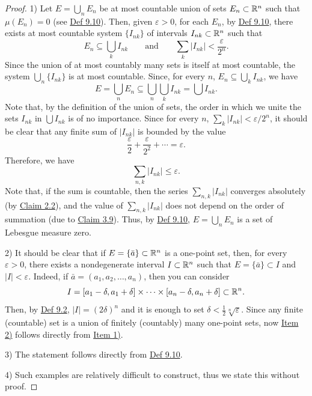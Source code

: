 \begin{proof}
1) Let $E=\bigcup_n E_n$ be at most countable union of sets $E_n\subset\mathbb{R}^n$ such that $\mu(E_n)=0$ (see \hyperref[def:9.10]{Def 9.10}).
Then, given $\varepsilon>0$, for each $E_n$, by \hyperref[def:9.10]{Def 9.10}, there exists at most countable system $\{I_{nk}\}$ of intervals $I_{nk}\subset\mathbb{R}^n$ such that
\[
E_n\subseteq\bigcup_k I_{nk}
\qquad\text{and}\qquad
\sum_k |I_{nk}|<\frac{\varepsilon}{2^n}.
\]
Since the union of at most countably many sets is itself at most countable, the system $\bigcup_n\{I_{nk}\}$ is at most countable. Since, for every $n$, $E_n\subseteq\bigcup_k I_{nk}$, we have
\[
E=\bigcup_n E_n\subseteq\bigcup_n\bigcup_k I_{nk}=\bigcup I_{nk}.
\]
Note that, by the definition of the union of sets, the order in which we unite the sets $I_{nk}$ in $\bigcup I_{nk}$ is of no importance.
Since for every $n$, $\sum_k |I_{nk}|<\varepsilon/2^n$, it should be clear that any finite sum of $|I_{nk}|$ is bounded by the value
\[
\frac{\varepsilon}{2}+\frac{\varepsilon}{2^2}+\cdots=\varepsilon.
\]
Therefore, we have
\[
\sum_{n,k}|I_{nk}|\leq\varepsilon.
\]
Note that, if the sum is countable, then the series $\sum_{n,k}|I_{nk}|$ converges absolutely (by \hyperref[claim:2.2]{Claim 2.2}), and the value of $\sum_{n,k}|I_{nk}|$ does not depend on the order of summation (due to \hyperref[claim:3.9]{Claim 3.9}).
Thus, by \hyperref[def:9.10]{Def 9.10}, $E=\bigcup_n E_n$ is a set of Lebesgue measure zero.

2) It should be clear that if $E=\{\bar a\}\subset\mathbb{R}^n$ is a one-point set, then, for every $\varepsilon>0$, there exists a nondegenerate interval $I\subset\mathbb{R}^n$ such that $E=\{\bar a\}\subset I$ and $|I|<\varepsilon$.
Indeed, if $\bar a=(a_1,a_2,\ldots,a_n)$, then you can consider
\[
I=[a_1-\delta,a_1+\delta]\times\cdots\times[a_n-\delta,a_n+\delta]\subset\mathbb{R}^n.
\]
Then, by \hyperref[def:9.2]{Def 9.2}, $|I|=(2\delta)^n$ and it is enough to set $\delta<\frac12\sqrt[n]{\varepsilon}$.
Since any finite (countable) set is a union of finitely (countably) many one-point sets, now \hyperref[item:claim:9.1:2]{Item 2)} follows directly from \hyperref[item:claim:9.1:1]{Item 1)}.

3) The statement follows directly from \hyperref[def:9.10]{Def 9.10}.

4) Such examples are relatively difficult to construct, thus we state this without proof.
\end{proof}

